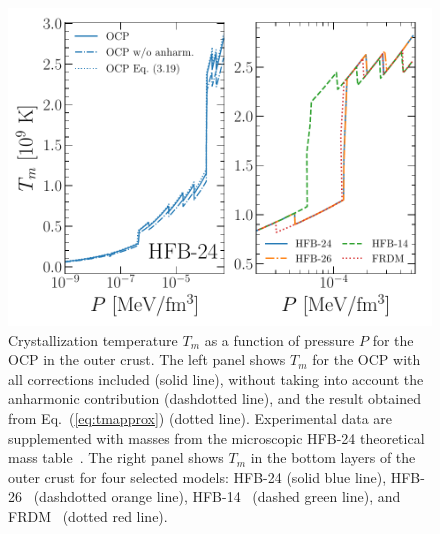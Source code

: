 \begin{figure}[!t]
  \begin{center}
    \includegraphics[width=0.9\linewidth]{figures/tm_ocrust.pdf}
  \end{center}
  \caption[Crystallization temperature versus pressure for the one-component 
  plasma in the outer crust]{Crystallization temperature $T_m$ as a function of
    pressure $P$ for the OCP in the outer crust. The left panel shows $T_m$ 
    for the  OCP with all corrections included (solid line), without 
    taking into account the anharmonic contribution (dashdotted line), and 
    the result obtained from Eq.~(\ref{eq:tmapprox}) (dotted line). 
    Experimental data are supplemented with masses from the microscopic HFB-24 
    theoretical mass table~\cite{Goriely2013}. 
    The right panel shows $T_m$ in the bottom layers of the outer crust for 
    four selected models: HFB-24 (solid blue line), HFB-26~\cite{Goriely2013}
    (dashdotted orange line), HFB-14~\cite{Goriely2007} (dashed green line), 
  and FRDM~\cite{Moller1995} (dotted red line).}\label{fig:tm_ocrust}
\end{figure}

